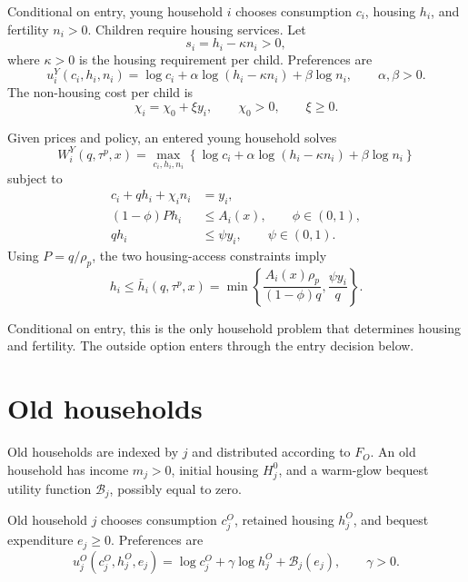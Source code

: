 \documentclass[11pt]{article}
\newcommand{\1}{\mathbf 1}
\begin{document}
Conditional on entry, young household $i$ chooses consumption $c_i$, housing $h_i$, and fertility $n_i>0$. Children require housing services. Let
\begin{equation}
s_i=h_i-\kappa n_i>0,
\end{equation}
where $\kappa>0$ is the housing requirement per child. Preferences are
\begin{equation}
u_i^Y(c_i,h_i,n_i)
=
\log c_i+\alpha\log(h_i-\kappa n_i)+\beta\log n_i,
\qquad
\alpha,\beta>0.
\label{eq:compact_young_utility}
\end{equation}
The non-housing cost per child is
\begin{equation}
\chi_i=\chi_0+\xi y_i,
\qquad
\chi_0>0,
\qquad
\xi\ge0.
\label{eq:compact_child_cost}
\end{equation}

Given prices and policy, an entered young household solves
\begin{equation}
W_i^Y(q,\tau^p,x)
=
\max_{c_i,h_i,n_i}
\left\{
\log c_i+\alpha\log(h_i-\kappa n_i)+\beta\log n_i
\right\}
\label{eq:compact_young_problem}
\end{equation}
subject to
\begin{align}
c_i+qh_i+\chi_i n_i&=y_i,
\label{eq:compact_young_budget}\\
(1-\phi)Ph_i&\le A_i(x),
\qquad
\phi\in(0,1),
\label{eq:compact_dp}\\
qh_i&\le \psi y_i,
\qquad
\psi\in(0,1).
\label{eq:compact_pti}
\end{align}
Using $P=q/\rho_p$, the two housing-access constraints imply
\begin{equation}
h_i\le
\bar h_i(q,\tau^p,x)
=
\min\left\{
\frac{A_i(x)\rho_p}{(1-\phi)q},
\frac{\psi y_i}{q}
\right\}.
\label{eq:compact_accessible_housing}
\end{equation}

Conditional on entry, this is the only household problem that determines housing and fertility. The outside option enters through the entry decision below.

\section{Old households}

Old households are indexed by $j$ and distributed according to $F_O$. An old household has income $m_j>0$, initial housing $H_j^0$, and a warm-glow bequest utility function $\mathcal B_j$, possibly equal to zero.

Old household $j$ chooses consumption $c_j^O$, retained housing $h_j^O$, and bequest expenditure $e_j\ge0$. Preferences are
\begin{equation}
u_j^O(c_j^O,h_j^O,e_j)
=
\log c_j^O+\gamma\log h_j^O+\mathcal B_j(e_j),
\qquad
\gamma>0.
\label{eq:compact_old_utility}
\end{equation}
\end{document}
